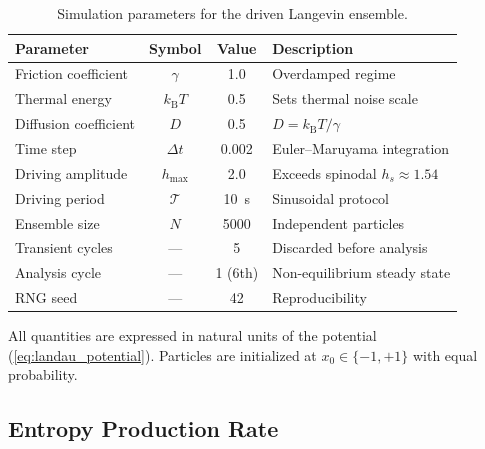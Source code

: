 \begin{table}[htbp]
    \centering
    \begin{threeparttable}
        \caption{Simulation parameters for the driven Langevin ensemble.}
        \label{tab:sim_params}
        \begin{tabular}{l c c l}
            \toprule
            \textbf{Parameter} & \textbf{Symbol} & \textbf{Value} & \textbf{Description} \\
            \midrule
            Friction coefficient & $\gamma$ & \num{1.0} & Overdamped regime \\
            Thermal energy & $k_{\mathrm{B}}T$ & \num{0.5} & Sets thermal noise scale \\
            Diffusion coefficient & $D$ & \num{0.5} & $D = k_{\mathrm{B}}T/\gamma$ \\
            Time step & $\Delta t$ & \num{0.002} & Euler--Maruyama integration \\
            Driving amplitude & $h_{\max}$ & \num{2.0} & Exceeds spinodal $h_s \approx 1.54$ \\
            Driving period & $\mathcal{T}$ & \SI{10}{s} & Sinusoidal protocol \\
            Ensemble size & $N$ & \num{5000} & Independent particles \\
            Transient cycles & --- & \num{5} & Discarded before analysis \\
            Analysis cycle & --- & 1 (6th) & Non-equilibrium steady state \\
            RNG seed & --- & 42 & Reproducibility \\
            \bottomrule
        \end{tabular}
        \begin{tablenotes}
            \small
            \item All quantities are expressed in natural units of the potential (\cref{eq:landau_potential}).
            Particles are initialized at $x_0 \in \{-1, +1\}$ with equal probability.
        \end{tablenotes}
    \end{threeparttable}
\end{table}


\subsection{Entropy Production Rate}
\label{sec:epr_theory}

